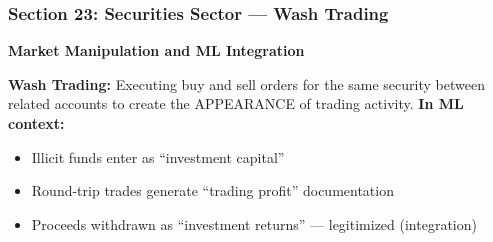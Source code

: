 \documentclass[12pt,aspectratio=169]{beamer}
\begin{document}
	\begin{frame}
		\frametitle{\fontsize{13}{15}\selectfont \textbf{Section 23: Securities Sector — Wash Trading}}
		\vspace{0.3cm}
		\begin{center}
			{\fontsize{12}{14}\selectfont \textbf{Market Manipulation and ML Integration}}
		\end{center}
		\vspace{0.2cm}
		\begin{block}{}
			\centering
			\textbf{Wash Trading:} Executing buy and sell orders for the same security between related accounts to create the APPEARANCE of trading activity.
			\vspace{0.1cm}
			\textbf{In ML context:}
			\begin{itemize}
				\item Illicit funds enter as ``investment capital''
				\item Round-trip trades generate ``trading profit'' documentation
				\item Proceeds withdrawn as ``investment returns'' — legitimized (integration)
			\end{itemize}
		\end{block}
	\end{frame}
	
\end{document}

